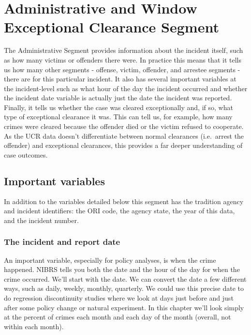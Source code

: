 \documentclass[
  12pt,
  openany]{book}
\begin{document}
\hypertarget{administrative-and-window-exceptional-clearance-segment}{%
\chapter{Administrative and Window Exceptional Clearance Segment}\label{administrative-and-window-exceptional-clearance-segment}}

The Administrative Segment provides information about the incident itself, such as how many victims or offenders there were. In practice this means that it tells us how many other segments - offense, victim, offender, and arrestee segments - there are for this particular incident. It also has several important variables at the incident-level such as what hour of the day the incident occurred and whether the incident date variable is actually just the date the incident was reported. Finally, it tells us whether the case was cleared exceptionally and, if so, what type of exceptional clearance it was. This can tell us, for example, how many crimes were cleared because the offender died or the victim refused to cooperate. As the UCR data doesn't differentiate between normal clearances (i.e.~arrest the offender) and exceptional clearances, this provides a far deeper understanding of case outcomes.

\hypertarget{important-variables}{%
\section{Important variables}\label{important-variables}}

In addition to the variables detailed below this segment has the tradition agency and incident identifiers: the ORI code, the agency state, the year of this data, and the incident number.

\hypertarget{the-incident-and-report-date}{%
\subsection{The incident and report date}\label{the-incident-and-report-date}}

An important variable, especially for policy analyses, is when the crime happened. NIBRS tells you both the date and the hour of the day for when the crime occurred. We'll start with the date. We can convert the date a few different ways, such as daily, weekly, monthly, quarterly. We could use this precise date to do regression discontinuity studies where we look at days just before and just after some policy change or natural experiment. In this chapter we'll look simply at the percent of crimes each month and each day of the month (overall, not within each month).
\end{document}
